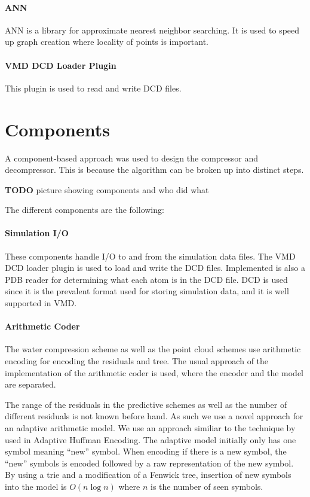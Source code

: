 \documentclass{report}
\newcommand{\todo}{\textbf{TODO} }
\begin{document}
\paragraph{ANN}
ANN is a library for approximate nearest neighbor searching. It is used to
speed up graph creation where locality of points is important. \citep{ann}

\paragraph{VMD DCD Loader Plugin}
This plugin is used to read and write DCD files. \citep{vmd}


\section{Components}
\label{sec:components}

A component-based approach was used to design the compressor and
decompressor. This is because the algorithm can be broken up into distinct
steps.

\todo picture showing components and who did what

The different components are the following:

\paragraph{Simulation I/O}

These components handle I/O to and from the simulation data files. The VMD DCD
loader plugin is used to load and write the DCD files. Implemented is also a
PDB reader for determining what each atom is in the DCD file. DCD is used
since it is the prevalent format used for storing simulation data, and it is
well supported in VMD.


\paragraph{Arithmetic Coder}

The water compression scheme as well as the point cloud schemes use arithmetic
encoding for encoding the residuals and tree. The usual approach of the
implementation of the arithmetic coder is used, where the encoder and the
model are separated.

The range of the residuals in the predictive schemes as well as the number of
different residuals is not known before hand. As such we use a novel approach
for an adaptive arithmetic model. We use an approach similiar to the technique
by \citep{cormack1984algorithms} used in Adaptive Huffman Encoding. The
adaptive model initially only has one symbol meaning ``new'' symbol. When
encoding if there is a new symbol, the ``new'' symbols is encoded followed by
a raw representation of the new symbol. By using a trie and a modification of
a Fenwick tree, insertion of new symbols into the model is $O(n \log n)$ where
$n$ is the number of seen symbols.
\end{document}
